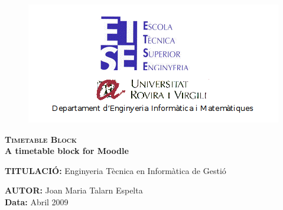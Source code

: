 \documentclass[a4paper]{report}  %
\begin{document}
 

\begin{titlepage}

		\begin{figure}[H] %
		\begin{center}
		\includegraphics{img/logodepartament.png}		
		\label{fig:logodepartament}
		\end{center}
		\end{figure}

\begin{center}
{\LARGE
\textsc{\textbf{Timetable Block}}\\
\textbf{A timetable block for Moodle}\\[7cm]
}%
\end{center}
\begin{flushleft}
\textbf{TITULACIÓ:} Enginyeria Tècnica en Informàtica de Gestió\\[5cm]
\end{flushleft}
\begin{flushright}
\textbf{AUTOR:} Joan Maria Talarn Espelta\\[1cm]
\textbf{Data:} Abril 2009\\
\end{flushright}

\end{titlepage}

\end{document}

